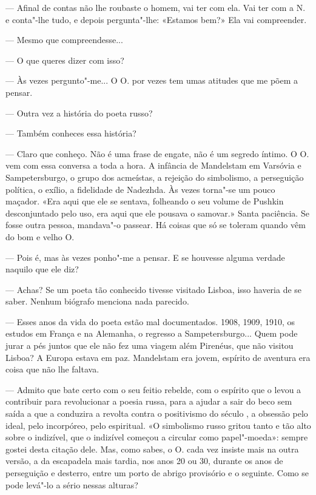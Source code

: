 --- Afinal de contas não lhe roubaste o homem, vai ter com ela. Vai ter
  com a N. e conta"-lhe tudo, e depois pergunta"-lhe: «Estamos bem?» Ela vai compreender.

--- Mesmo que compreendesse...

--- O que queres dizer com isso?

--- Às vezes pergunto"-me... O O. por vezes tem umas atitudes que me põem
  a pensar.

--- Outra vez a história do poeta russo?

--- Também conheces essa história?

--- Claro que conheço. Não é uma frase de engate, não é um segredo íntimo.
  O O. vem com essa conversa a toda a hora. A infância de Mandelstam em
  Varsóvia e Sampetersburgo, o grupo dos acmeístas, a rejeição do
  simbolismo, a perseguição política, o exílio, a fidelidade de
  Nadezhda. Às vezes torna"-se um pouco maçador. «Era aqui que ele se
  sentava, folheando o seu volume de Pushkin desconjuntado pelo uso, era
  aqui que ele pousava o samovar.» Santa paciência. Se fosse outra
  pessoa, mandava"-o passear. Há coisas que só se toleram quando vêm do
  bom e velho O.

--- Pois é, mas às vezes ponho"-me a pensar. E se houvesse alguma verdade
  naquilo que ele diz?

--- Achas? Se um poeta tão conhecido tivesse visitado Lisboa, isso
  haveria de se saber. Nenhum biógrafo menciona nada parecido.

--- Esses anos da vida do poeta estão mal documentados. 1908, 1909, 1910,
  os estudos em França e na Alemanha, o regresso a Sampetersburgo...
  Quem pode jurar a pés juntos que ele não fez uma viagem além Pirenéus,
  que não visitou Lisboa? A Europa estava em paz. Mandelstam era jovem,
  espírito de aventura era coisa que não lhe faltava.




--- Admito que bate certo com o seu feitio rebelde, com o espírito que o
  levou a contribuir para revolucionar a poesia russa, para a ajudar a
  sair do beco sem saída a que a conduzira a revolta contra o
  positivismo do século , a obsessão pelo ideal, pelo incorpóreo,
  pelo espiritual. «O simbolismo russo gritou tanto e tão alto sobre o
  indizível, que o indizível começou a circular como papel"-moeda»:
  sempre gostei desta citação dele. Mas, como sabes, o O. cada vez
  insiste mais na outra versão, a da escapadela mais tardia, nos anos 20
  ou 30, durante os anos de perseguição e desterro, entre um porto de
  abrigo provisório e o seguinte. Como se pode levá"-lo a sério nessas
  alturas?

